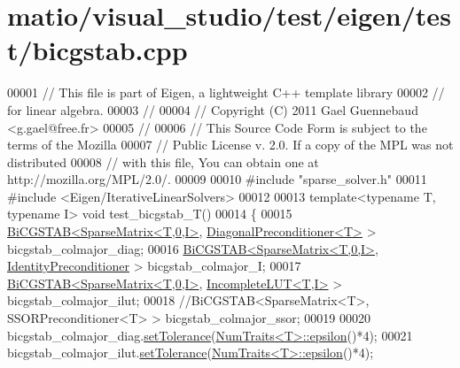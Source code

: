 \hypertarget{matio_2visual__studio_2test_2eigen_2test_2bicgstab_8cpp_source}{}\section{matio/visual\+\_\+studio/test/eigen/test/bicgstab.cpp}
\label{matio_2visual__studio_2test_2eigen_2test_2bicgstab_8cpp_source}

\begin{DoxyCode}
00001 \textcolor{comment}{// This file is part of Eigen, a lightweight C++ template library}
00002 \textcolor{comment}{// for linear algebra.}
00003 \textcolor{comment}{//}
00004 \textcolor{comment}{// Copyright (C) 2011 Gael Guennebaud <g.gael@free.fr>}
00005 \textcolor{comment}{//}
00006 \textcolor{comment}{// This Source Code Form is subject to the terms of the Mozilla}
00007 \textcolor{comment}{// Public License v. 2.0. If a copy of the MPL was not distributed}
00008 \textcolor{comment}{// with this file, You can obtain one at http://mozilla.org/MPL/2.0/.}
00009 
00010 \textcolor{preprocessor}{#include "sparse\_solver.h"}
00011 \textcolor{preprocessor}{#include <Eigen/IterativeLinearSolvers>}
00012 
00013 \textcolor{keyword}{template}<\textcolor{keyword}{typename} T, \textcolor{keyword}{typename} I> \textcolor{keywordtype}{void} test\_bicgstab\_T()
00014 \{
00015   \hyperlink{group___iterative_linear_solvers___module_class_eigen_1_1_bi_c_g_s_t_a_b}{BiCGSTAB<SparseMatrix<T,0,I>}, 
      \hyperlink{group___iterative_linear_solvers___module_class_eigen_1_1_diagonal_preconditioner}{DiagonalPreconditioner<T>} >     bicgstab\_colmajor\_diag;
00016   \hyperlink{group___iterative_linear_solvers___module_class_eigen_1_1_bi_c_g_s_t_a_b}{BiCGSTAB<SparseMatrix<T,0,I>}, 
      \hyperlink{group___iterative_linear_solvers___module_class_eigen_1_1_identity_preconditioner}{IdentityPreconditioner}    >     bicgstab\_colmajor\_I;
00017   \hyperlink{group___iterative_linear_solvers___module_class_eigen_1_1_bi_c_g_s_t_a_b}{BiCGSTAB<SparseMatrix<T,0,I>}, \hyperlink{group___iterative_linear_solvers___module_class_eigen_1_1_incomplete_l_u_t}{IncompleteLUT<T,I>} >         
           bicgstab\_colmajor\_ilut;
00018   \textcolor{comment}{//BiCGSTAB<SparseMatrix<T>, SSORPreconditioner<T> >     bicgstab\_colmajor\_ssor;}
00019 
00020   bicgstab\_colmajor\_diag.\hyperlink{group___iterative_linear_solvers___module_ac160a444af8998f93da9aa30e858470d}{setTolerance}(\hyperlink{group___core___module_struct_eigen_1_1_num_traits}{NumTraits<T>::epsilon}()*4);
00021   bicgstab\_colmajor\_ilut.\hyperlink{group___iterative_linear_solvers___module_ac160a444af8998f93da9aa30e858470d}{setTolerance}(\hyperlink{group___core___module_struct_eigen_1_1_num_traits}{NumTraits<T>::epsilon}()*4);

\end{DoxyCode}
